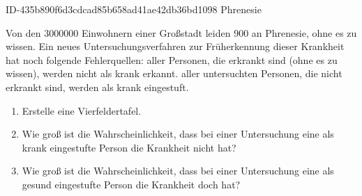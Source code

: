 \begin{exercise}
      {ID-435b890f6d3cdcad85b658ad41ae42db36bd1098}
      {Phrenesie}
  \ifproblem\problem\par
    Von den \num{3000000} Einwohnern einer Großstadt leiden 900 an Phrenesie,
    ohne es zu wissen. Ein neues Untersuchungsverfahren zur Früherkennung dieser
    Krankheit hat noch folgende Fehlerquellen:  aller Personen, die erkrankt
    sind (ohne es zu wissen), werden nicht als krank erkannt.  aller
    untersuchten Personen, die nicht erkrankt sind, werden als krank eingestuft.
    \begin{enumerate}
      \item Erstelle eine Vierfeldertafel.
      \item Wie groß ist die Wahrscheinlichkeit, dass bei einer Untersuchung
            eine als krank eingestufte Person die Krankheit nicht hat?
      \item Wie groß ist die Wahrscheinlichkeit, dass bei einer Untersuchung
            eine als gesund eingestufte Person die Krankheit doch hat?
    \end{enumerate}
  \fi
\end{exercise}
